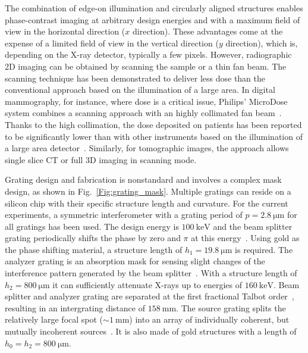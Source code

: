 \documentclass{pnastwo}
\begin{document}
\begin{article}
The combination of edge-on illumination and circularly aligned structures
enables phase-contrast imaging at arbitrary design energies and with a
maximum field of view in the horizontal direction ($x$ direction). These
advantages come at the expense of a limited field of view in the vertical
direction ($y$ direction), which is, depending on the X-ray detector,
typically a few pixels. 
However, radiographic 2D imaging can be obtained by scanning the sample or a thin fan
beam. The scanning technique has been demonstrated to deliver less dose than
the conventional approach based on the illumination of a large area. In
digital mammography, for instance, where dose is a critical issue, Philips'
MicroDose system combines a scanning approach with an highly collimated fan
beam~\cite{Aslund2007}. Thanks to the high collimation, the dose deposited
on  patients has been reported to be significantly lower than with other
instruments based on the illumination of a large area
detector~\cite{Oduko2010}.
Similarly, for tomographic images,
the approach allows single slice CT or full 3D imaging in scanning mode.

Grating design and fabrication is nonstandard and involves a complex mask
design, as shown in Fig.~\ref{Fig:grating_mask}. Multiple gratings can reside on a
silicon chip with their specific structure length and curvature. For the
current experiments, a symmetric interferometer with a grating period of $p
= \SI{2.8}{\micro\metre}$ for all gratings has been used. The design energy
is $\SI{100}{\kilo\electronvolt}$ and the beam splitter grating periodically
shifts the phase by zero and $\pi$ at this energy~\cite{David2002}. Using
gold as the phase shifting material, a structure length of
$h_1 = \SI{19.8}{\micro \metre}$ is required. The analyzer grating is an absorption mask
for sensing slight changes of the interference pattern generated by the beam
splitter~\cite{Momose2003a}. With a structure length of $h_2 =
\SI{800}{\micro \metre}$
it can sufficiently attenuate X-rays up to energies of 
$\SI{160}{\kilo\electronvolt}$. Beam splitter and analyzer grating are
separated at the first fractional Talbot order~\cite{Weitkamp2005},
resulting in an intergrating distance of $\SI{158}{\milli\metre}$. The
source grating splits the relatively large focal spot ($\sim
\SI{1}{\milli\metre}$) into an array of individually coherent, but mutually
incoherent sources~\cite{Pfeiffer2006}. It is also made of gold structures
with a length of $h_0 = h_2 = \SI{800}{\micro \metre}$.


\end{article}
\end{document}
